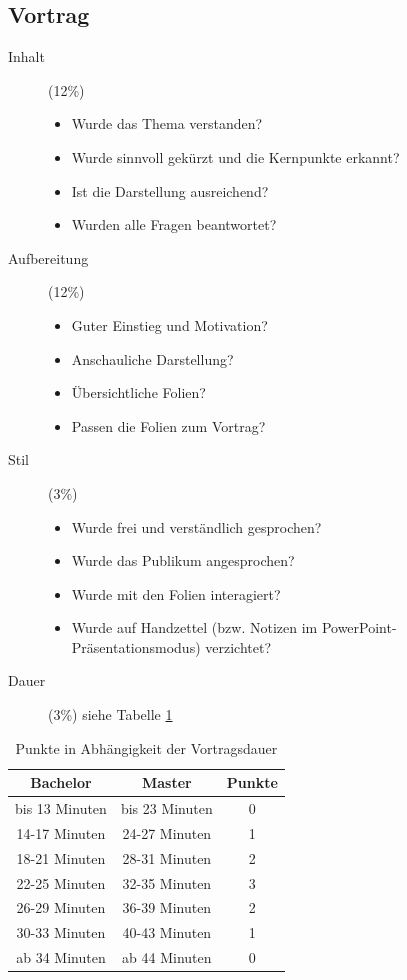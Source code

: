 \documentclass[final,bibliography=totocnumbered]{include/sikseminar}
\begin{document}
\subsection{Vortrag}
\begin{description}
  \item[Inhalt] (12\%)
    \begin{itemize}
      \item Wurde das Thema verstanden?
      \item Wurde sinnvoll gekürzt und die Kernpunkte erkannt?
      \item Ist die Darstellung ausreichend?
      \item Wurden alle Fragen beantwortet?
    \end{itemize}
  \item[Aufbereitung] (12\%)
    \begin{itemize}
      \item Guter Einstieg und Motivation?
      \item Anschauliche Darstellung?
      \item Übersichtliche Folien?
      \item Passen die Folien zum Vortrag?
    \end{itemize}
  \item[Stil] (3\%)
    \begin{itemize}
      \item Wurde frei und verständlich gesprochen?
      \item Wurde das Publikum angesprochen?
      \item Wurde mit den Folien interagiert?
	  \item Wurde auf Handzettel (bzw. Notizen im PowerPoint-Präsentationsmodus) verzichtet?
    \end{itemize}
  \item[Dauer] (3\%)
    siehe Tabelle \ref{tab:dauer}
\end{description}

\begin{table}[htb]
  \caption{Punkte in Abhängigkeit der Vortragsdauer}
  \centering
  \begin{tabular}{c|c|c}
    Bachelor & Master & Punkte \\
    \hline
    bis 13 Minuten & bis 23 Minuten & 0 \\
    14-17 Minuten & 24-27 Minuten & 1 \\
    18-21 Minuten & 28-31 Minuten & 2 \\
    22-25 Minuten & 32-35 Minuten & 3 \\
    26-29 Minuten & 36-39 Minuten & 2 \\
    30-33 Minuten & 40-43 Minuten & 1 \\
    ab 34 Minuten & ab 44 Minuten & 0 \\
  \end{tabular}
  \label{tab:dauer}
\end{table}
\end{document}
